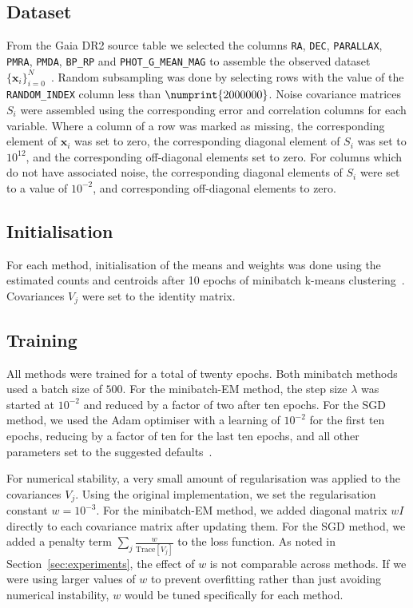 \documentclass{article}
\newcommand{\bx}{\mathbf{x}}
\begin{document}
\subsection{Dataset}

From the Gaia DR2 source table we selected the columns \texttt{RA}, \texttt{DEC}, \texttt{PARALLAX}, \texttt{PMRA}, \texttt{PMDA}, \texttt{BP\_RP} and \texttt{PHOT\_G\_MEAN\_MAG} to assemble the observed dataset $\{\bx_i\}_{i=0}^N$~\cite{brownGaiaDataRelease2018}.
Random subsampling was done by selecting rows with the value of the \texttt{RANDOM\_INDEX} column less than $\numprint{2000000}$.
Noise covariance matrices $S_i$ were assembled using the corresponding error and correlation columns for each variable.
Where a column of a row was marked as missing, the corresponding element of $\bx_i$ was set to zero, the corresponding diagonal element of $S_i$ was set to $10^{12}$, and the corresponding off-diagonal elements set to zero.
For columns which do not have associated noise, the corresponding diagonal elements of $S_i$ were set to a value of $10^{-2}$, and corresponding off-diagonal elements to zero.

\subsection{Initialisation}
For each method, initialisation of the means and weights was done using the estimated counts and centroids after 10 epochs of minibatch k-means clustering~\cite{sculleyWebscaleKmeansClustering2010}.
Covariances $V_j$ were set to the identity matrix.

\subsection{Training}

All methods were trained for a total of twenty epochs.
Both minibatch methods used a batch size of $500$.
For the minibatch-EM method, the step size $\lambda$ was started at $10^{-2}$ and reduced by a factor of two after ten epochs.
For the SGD method, we used the Adam optimiser with a learning of $10^{-2}$ for the first ten epochs, reducing by a factor of ten for the last ten epochs, and all other parameters set to the suggested defaults~\cite{kingmaAdamMethodStochastic2014}.

For numerical stability, a very small amount of regularisation was applied to the covariances $V_j$.
Using the original implementation, we set the regularisation constant $w = 10^{-3}$.
For the minibatch-EM method, we added diagonal matrix $wI$ directly to each covariance matrix after updating them.
For the SGD method, we added a penalty term $\sum_j \frac{w}{\mathrm{Trace}[V_j]}$ to the loss function.
As noted in Section~\ref{sec:experiments}, the effect of $w$ is not comparable across methods.
If we were using larger values of $w$ to prevent overfitting rather than just avoiding numerical instability, $w$ would be tuned specifically for each method.
\end{document}
